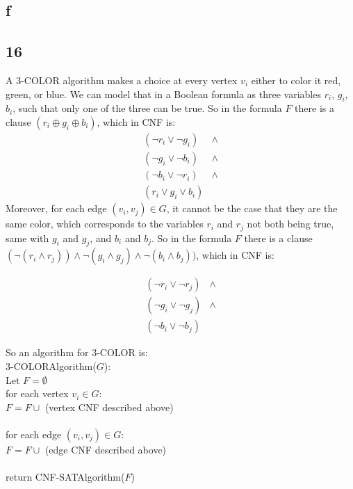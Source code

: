 \documentclass[letterpaper,notitlepage,twoside]{article}
\newcommand{\union}{\cup}
\newcommand\tab[1][1cm]{\hspace*{#1}} %
\begin{document}
\subsection*{f}

\subsection*{16}
A 3-COLOR algorithm makes a choice at every vertex $v_i$ either to color it red, green, or blue. We can model that in a Boolean formula as three variables $r_i$, $g_i$, $b_i$, such that only one of the three can be true. So in the formula $F$ there is a clause $(r_i \oplus g_i \oplus b_i)$, which in CNF is:
\begin{align*}
(\neg r_i \lor \neg g_i) &\land \\
(\neg g_i \lor \neg b_i) &\land \\
(\neg b_i \lor \neg r_i) &\land \\
(r_i \lor g_i \lor b_i) 
\end{align*}
Moreover, for each edge $(v_i, v_j) \in G$, it cannot be the case that they are the same color, which corresponds to the variables $r_i$ and $r_j$ not both being true, same with $g_i$ and $g_j$, and $b_i$ and $b_j$. So in the formula $F$ there is a clause $(\neg (r_i \land r_j)) \land \neg (g_i \land g_j) \land \neg (b_i \land b_j))$, which in CNF is:

\begin{align*}
(\neg r_i \lor \neg r_j) &\land \\
(\neg g_i \lor \neg g_j) &\land \\
(\neg b_i \lor \neg b_j)
\end{align*}

So an algorithm for 3-COLOR is:\\
3-COLORAlgorithm($G$):\\
\tab Let $F = \emptyset$ \\
\tab for each vertex $v_i \in G$: \\
\tab\tab $F = F \union$ (vertex CNF described above)
\\\\
\tab for each edge $(v_i, v_j) \in G$: \\
\tab\tab $F = F \union$ (edge CNF described above)
\\\\
\tab return CNF-SATAlgorithm($F$)
\\\\
\end{document}
